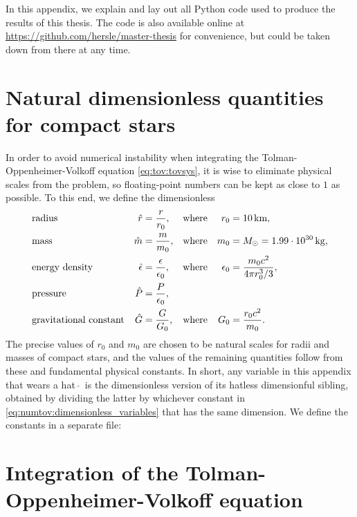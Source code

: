 In this appendix, we explain and lay out all Python code used to produce the results of this thesis.
The code is also available online at \url{https://github.com/hersle/master-thesis} for convenience,
but could be taken down from there at any time.

\section{Natural dimensionless quantities for compact stars}

In order to avoid numerical instability when integrating the Tolman-Oppenheimer-Volkoff equation \eqref{eq:tov:tovsys},
it is wise to eliminate physical scales from the problem,
so floating-point numbers can be kept as close to $1$ as possible.
To this end, we define the dimensionless
\begin{subequations}
\begin{align}
	& \text{radius}                 & \hat{r}        &= \frac{r}{r_0}               , & \text{where} && r_0        &= \SI{10}{\kilo\meter} , \\
	& \text{mass}                   & \hat{m}        &= \frac{m}{m_0}               , & \text{where} && m_0        &= M_\odot = \SI{1.99e30}{\kilogram} , \\
	& \text{energy density}         & \hat{\epsilon} &= \frac{\epsilon}{\epsilon_0} , & \text{where} && \epsilon_0 &= \frac{m_0 c^2}{4 \pi r_0^3 / 3} , \\
	& \text{pressure}               &  \hat{P}       &= \frac{P}{\epsilon_0}        , \\
	& \text{gravitational constant} & \hat{G}        &= \frac{G}{G_0}               , & \text{where} && G_0 &= \frac{r_0 c^2}{m_0} .
\end{align}%
\label{eq:numtov:dimensionless_variables}%
\end{subequations}%
The precise values of $r_0$ and $m_0$ are chosen to be natural scales for radii and masses of compact stars, and the values of the remaining quantities follow from these and fundamental physical constants.
In short, any variable in this appendix that wears a hat $\, \hat{} \, $ is the dimensionless version of its hatless dimensionful sibling, obtained by dividing the latter by whichever constant in \cref{eq:numtov:dimensionless_variables} that has the same dimension.
We define the constants in a separate file:


\section{Integration of the Tolman-Oppenheimer-Volkoff equation}
\label{sec:nstars:numtov}

